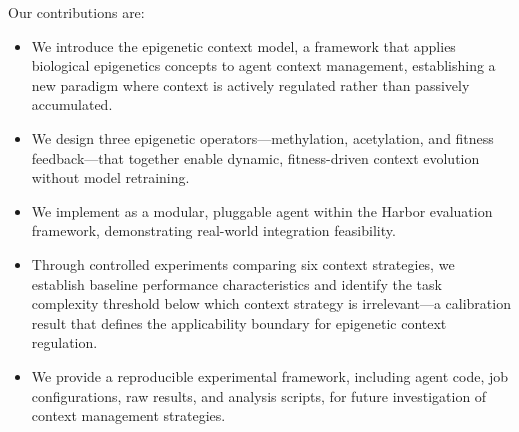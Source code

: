 Our contributions are:
\begin{itemize}
    \item We introduce the epigenetic context model, a framework that applies biological epigenetics concepts to agent context management, establishing a new paradigm where context is actively regulated rather than passively accumulated.
    \item We design three epigenetic operators---methylation, acetylation, and fitness feedback---that together enable dynamic, fitness-driven context evolution without model retraining.
    \item We implement \EpiContext{} as a modular, pluggable agent within the Harbor evaluation framework, demonstrating real-world integration feasibility.
    \item Through controlled experiments comparing six context strategies, we establish baseline performance characteristics and identify the task complexity threshold below which context strategy is irrelevant---a calibration result that defines the applicability boundary for epigenetic context regulation.
    \item We provide a reproducible experimental framework, including agent code, job configurations, raw results, and analysis scripts, for future investigation of context management strategies.
\end{itemize}